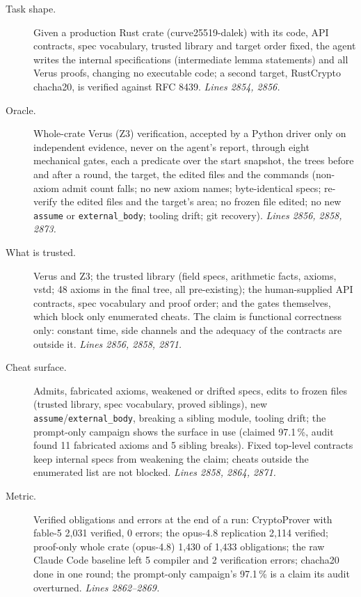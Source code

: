 \documentclass[11pt]{article}
\begin{document}
\begin{description}
\item[Task shape.] Given a production Rust crate (curve25519-dalek) with its
  code, API contracts, spec vocabulary, trusted library and target order fixed,
  the agent writes the internal specifications (intermediate lemma statements)
  and all Verus proofs, changing no executable code; a second target,
  RustCrypto chacha20, is verified against RFC 8439. \emph{Lines 2854, 2856.}
\item[Oracle.] Whole-crate Verus (Z3) verification, accepted by a Python driver
  only on independent evidence, never on the agent's report, through eight
  mechanical gates, each a predicate over the start snapshot, the trees before
  and after a round, the target, the edited files and the commands (non-axiom
  admit count falls; no new axiom names; byte-identical specs; re-verify the
  edited files and the target's area; no frozen file edited; no new
  \texttt{assume} or \texttt{external\_body}; tooling drift; git recovery).
  \emph{Lines 2856, 2858, 2873.}
\item[What is trusted.] Verus and Z3; the trusted library (field specs,
  arithmetic facts, axioms, vstd; 48 axioms in the final tree, all
  pre-existing); the human-supplied API contracts, spec vocabulary and proof
  order; and the gates themselves, which block only enumerated cheats. The
  claim is functional correctness only: constant time, side channels and the
  adequacy of the contracts are outside it. \emph{Lines 2856, 2858, 2871.}
\item[Cheat surface.] Admits, fabricated axioms, weakened or drifted specs,
  edits to frozen files (trusted library, spec vocabulary, proved siblings),
  new \texttt{assume}/\texttt{external\_body}, breaking a sibling module,
  tooling drift; the prompt-only campaign shows the surface in use (claimed
  97.1\,\%, audit found 11 fabricated axioms and 5 sibling breaks). Fixed
  top-level contracts keep internal specs from weakening the claim; cheats
  outside the enumerated list are not blocked. \emph{Lines 2858, 2864, 2871.}
\item[Metric.] Verified obligations and errors at the end of a run:
  CryptoProver with fable-5 2,031 verified, 0 errors; the opus-4.8 replication
  2,114 verified; proof-only whole crate (opus-4.8) 1,430 of 1,433 obligations;
  the raw Claude Code baseline left 5 compiler and 2 verification errors;
  chacha20 done in one round; the prompt-only campaign's 97.1\,\% is a claim
  its audit overturned. \emph{Lines 2862--2869.}

\end{description}
\end{document}
